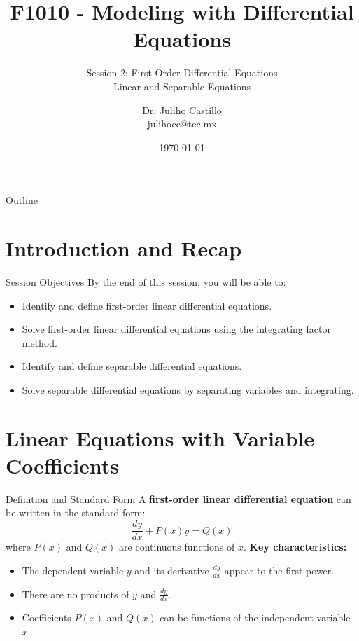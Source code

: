 \documentclass[10pt,aspectratio=169]{beamer}
\title{F1010 - Modeling with Differential Equations}
\subtitle{Session 2: First-Order Differential Equations \\ Linear and Separable Equations}
\author{Dr. Juliho Castillo\\julihocc@tec.mx}
\institute{School of Engineering and Sciences\\Academic Department of Sciences}
\date{\today}
\newcounter{problemcounter}
\begin{document}
\setcounter{problemcounter}{0}

\maketitle

\begin{frame}{Outline}
    \tableofcontents
\end{frame}

\section{Introduction and Recap}

\begin{frame}{Session Objectives}
    By the end of this session, you will be able to:
    \begin{itemize}
        \item Identify and define first-order linear differential equations.
        \item Solve first-order linear differential equations using the integrating factor method.
        \item Identify and define separable differential equations.
        \item Solve separable differential equations by separating variables and integrating.
    \end{itemize}
\end{frame}

\section{Linear Equations with Variable Coefficients}

\begin{frame}{Definition and Standard Form}
    A \textbf{first-order linear differential equation} can be written in the standard form:
    \begin{equation}
        \frac{dy}{dx} + P(x)y = Q(x)
        \label{eq:linear_de_standard_form}
    \end{equation}
    where $P(x)$ and $Q(x)$ are continuous functions of $x$.
    \vspace{1em}
    \textbf{Key characteristics:}
    \begin{itemize}
        \item The dependent variable $y$ and its derivative $\frac{dy}{dx}$ appear to the first power.
        \item There are no products of $y$ and $\frac{dy}{dx}$.
        \item Coefficients $P(x)$ and $Q(x)$ can be functions of the independent variable $x$.
    \end{itemize}
\end{frame}
\end{document}
